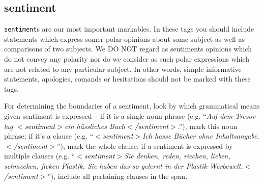 \documentclass[11pt,a4paper]{article}
\newcommand{\xmltag}[1]{\textcolor{black}{{\small$<$#1$>$}}}
\begin{document}
\subsection{sentiment}
\texttt{sentiment}s are our most important markables.  In these tags
you should include statements which express somer polar opinions about
some subject as well as comparisons of two subjects.  We DO NOT regard
as sentiments opinions which do not convey any polarity nor do we
consider as such polar expressions which are not related to any
particular subject.  In other words, simple informative statements,
apologies, comands or hesitations should not be marked with these
tags.

For determining the boundaries of a sentiment, look by which
grammatical means given sentiment is expressed -- if it is a single
noun phrase (e.g. ``\textit{Auf dem Tresor lag \xmltag{sentiment}ein
  h\"assliches Buch\xmltag{/sentiment}}.''), mark this noun phrase; if
it's a clause (e.g. ``\textit{\xmltag{sentiment}Ich hasse B\"ucher
  ohne Inhaltsangabe.\xmltag{/sentiment}}''), mark the whole clause;
if a sentiment is expressed by multiple clauses
(e.g. ``\textit{\xmltag{sentiment}Sie denken, reden, riechen, lieben,
  schmecken, ficken Plastik. Sie haben das so gelernt in der
  Plastik-Werbewelt.\xmltag{/sentiment}}''), include all pertaining
clauses in the span.
\end{document}
